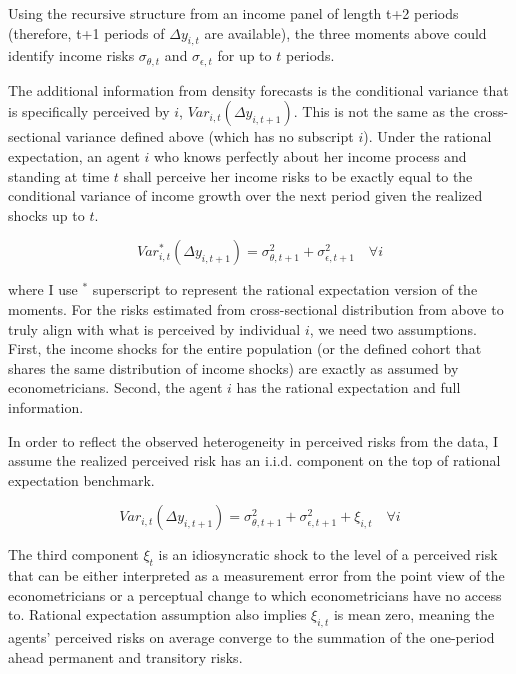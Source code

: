 \documentclass[12pt,notitlepage,onecolumn,aps,pra]{article}
\begin{document}
Using the recursive structure from an income panel of length t+2 periods
(therefore, t+1 periods of \(\Delta y_{i,t}\) are available), the three
moments above could identify income risks \(\sigma_{\theta,t}\) and
\(\sigma_{\epsilon,t}\) for up to \(t\) periods.

The additional information from density forecasts is the conditional
variance that is specifically perceived by \(i\),
\(Var_{i,t}(\Delta y_{i,t+1})\). This is not the same as the
cross-sectional variance defined above (which has no subscript \(i\)).
Under the rational expectation, an agent \(i\) who knows perfectly about
her income process and standing at time \(t\) shall perceive her income
risks to be exactly equal to the conditional variance of income growth
over the next period given the realized shocks up to \(t\).

\begin{equation}
\label{VarCRE}
 Var^*_{i,t}(\Delta y_{i,t+1}) = \sigma^2_{\theta,t+1} + \sigma^2_{\epsilon,t+1} \quad \forall i
\end{equation}

where I use \({}^*\) superscript to represent the rational expectation
version of the moments. For the risks estimated from cross-sectional
distribution from above to truly align with what is perceived by
individual \(i\), we need two assumptions. First, the income shocks for
the entire population (or the defined cohort that shares the same
distribution of income shocks) are exactly as assumed by
econometricians. Second, the agent \(i\) has the rational expectation
and full information.

In order to reflect the observed heterogeneity in perceived risks from
the data, I assume the realized perceived risk has an i.i.d. component
on the top of rational expectation benchmark.

\begin{equation}
\label{VarCIRE}
 Var_{i,t}(\Delta y_{i,t+1}) = \sigma^2_{\theta,t+1} + \sigma^2_{\epsilon,t+1} + \xi_{i,t} \quad \forall i
\end{equation}

The third component \(\xi_t\) is an idiosyncratic shock to the level of
a perceived risk that can be either interpreted as a measurement error
from the point view of the econometricians or a perceptual change to
which econometricians have no access to. Rational expectation assumption
also implies \(\xi_{i,t}\) is mean zero, meaning the agents' perceived
risks on average converge to the summation of the one-period ahead
permanent and transitory risks.
\end{document}
